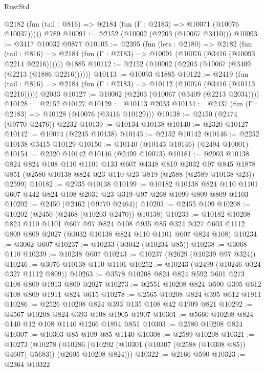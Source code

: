 \begin{lexlean}{RustStd}
\begin{coremodule}
      @2182 (fun (tail : @816) => @2184 (fun (Γ : @2183) => @10071 (@10076 @10037)))))
    @789
@10091 := @2152 (@10002 (@2203 (@10067 @3410)))
@10093 := @3417 @10032 @9877
@10105 := @2395
    (fun (lets : @2180) =>
    @2182
      (fun (tail : @816) =>
      @2184 (fun (Γ : @2183) => @10091 (@10076 (@3416 (@10093 @2214 @2216))))))
    @1885
@10112 := @2152 (@10002 (@2203 (@10067 (@3409 (@2213 (@1886 @2216))))))
@10113 := @10093 @1885
@10122 := @2419
    (fun (tail : @816) => @2184 (fun (Γ : @2183) => @10112 (@10076 (@3416 (@10113 @2216)))))
    @2033
@10127 := @10002 (@2203 (@10067 (@3409 (@2213 @2034))))
@10128 := @2152 @10127
@10129 := @10113 @2033
@10134 := @2437 (fun (Γ : @2183) => @10128 (@10076 (@3416 @10129)))
@10138 := @2450 (@2474 (@9770 @2476)) @2232
@10139 := @10134 @10138
@10140 := @2320 @10127
@10142 := @10074 (@2245 @10138)
@10143 := @2152 @10142
@10146 := @2252 @10138 @3415 @10129
@10150 := @10140 (@10143 @10146) (@2494 @10001)
@10154 := @2320 @10142 @10146 (@2499 @10073)
@10181 := @2903
    @10138
    @824
    @824
    @108
    @110
    @1101
    @133
    @607
    @4348
    @819
    @2032
    @97
    @845
    @1878
    @851
    (@2580 @10138 @824 @23 @110 @23 @819 (@2588 (@2589 @10138 @23)) @2599)
@10182 := @2935 @10138
@10199 := @10182
    @10138
    @824
    @110
    @1101
    @607
    @442
    @824
    @108
    @2031
    @23
    @319
    @97
    @268
    @1099
    @809
    @809
    @1103
@10202 := @2450 (@2462 (@9770 @2464))
@10203 := @2455 @109
@10208 := @10202 (@2450 (@2468 (@10203 @2470)) @10138)
@10233 := @10182
    @10208
    @824
    @110
    @1101
    @607
    @97
    @824
    @108
    @935
    @85
    @324
    @327
    @603
    @1112
    @809
    @809
    @2027
    (@3032 @10138 @824 @110 @1101 @607 @824 @108)
@10234 := @3062 @607
@10237 := @10233 (@3042 (@10234 @85))
@10238 := @3068 @110
@10239 := @10238 @607
@10243 := @10237 (@2629 (@10239 @97 @324))
@10246 := @3076 @10138 @110 @1101
@10252 := @10243 (@2499 (@10246 @324 @327 @1112 @809))
@10263 := @3578 @10208 @824 @824 @592 @601 @273 @108 @809 @1913 @809 @2027
@10273 := @2551 @10208 @824 @590 @395 @612 @108 @809 @1911 @824 @615
@10278 := @2565 @10208 @824 @395 @612 @1911
@10286 := @2526 @10208 @824 @393 @135 @108 @42 @1909 @821
@10292 := @4567 @10208 @824 @393 @108 @1905 @1907
@10301 := @5660 @10208 @824 @140 @12 @108 @1140 @1266 @1894 @851
@10303 := @2580 @10208 @824
@10307 := @10303 @85 @109 @85 @1140
@10308 := @2589 @10208
@10321 := @10273
    (@10278
      (@10286 (@10292 (@10301 (@10307 (@2588 (@10308 @85)) @4607) @5683)) (@2605 @10208 @824)))
@10322 := @2166 @590
@10323 := @2364 @10322

\end{coremodule}
\end{lexlean}
